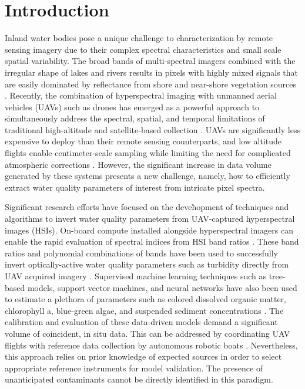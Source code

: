 \documentclass[remotesensing,article,submit,pdftex,moreauthors]{Definitions/mdpi}
\begin{document}
\section{Introduction}


Inland water bodies pose a unique challenge to characterization by remote sensing imagery due to their complex spectral characteristics and small scale spatial variability. The broad bands of multi-spectral imagers combined with the irregular shape of lakes and rivers results in pixels with highly mixed signals that are easily dominated by reflectance from shore and near-shore vegetation sources \cite{koponen2002lake, ritchie2003remote}. Recently, the combination of hyperspectral imaging with unmanned aerial vehicles (UAVs) such as drones has emerged as a powerful approach to simultaneously address the spectral, spatial, and temporal limitations of traditional high-altitude and satellite-based collection \cite{adao2017hyperspectral,arroyo2019implementation}. UAVs are significantly less expensive to deploy than their remote sensing counterparts, and low altitude flights enable centimeter-scale sampling while limiting the need for complicated atmospheric corrections \cite{banerjee2020uav}. However, the significant increase in data volume generated by these systems presents a new challenge, namely, how to efficiently extract water quality parameters of interest from intricate pixel spectra.


Significant research efforts have focused on the deveħopment of techniques and algorithms to invert water quality parameters from UAV-captured hyperspectral images (HSIs). On-board compute installed alongside hyperspectral imagers can enable the rapid evaluation of spectral indices from HSI band ratios \cite{horstrand2019uav}. These band ratios and polynomial combinations of bands have been used to successfully invert optically-active water quality parameters such as turbidity directly from UAV acquired imagery \cite{vogt2016near, zhang2022selection}. Supervised machine learning techniques such as tree-based models, support vector machines, and neural networks have also been used to estimate a plethora of parameters such as colored dissolved organic matter, chlorophyll a, blue-green algae, and suspended sediment concentrations \cite{keller2018hyperspectral, lu2021retrieval}. The calibration and evaluation of these data-driven models demand a significant volume of coincident, in situ data. This can be addressed by coordinating UAV flights with reference data collection by autonomous robotic boats \cite{robot-team-1, robot-team-2}. Nevertheless, this approach relies on prior knowledge of expected sources in order to select appropriate reference instruments for model validation. The presence of unanticipated contaminants cannot be directly identified in this paradigm. 
\end{document}
